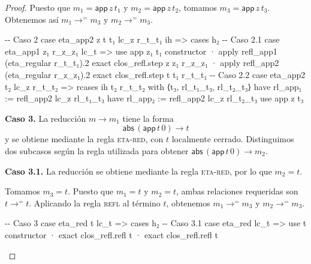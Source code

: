 \documentclass[
  spanish,
  letterpaper,
  DIV=11,
  numbers=noendperiod]{scrreprt}
\newenvironment{Shaded}{\begin{snugshade}}{\end{snugshade}}
\newcommand{\CommentTok}[1]{\textcolor[rgb]{0.37,0.37,0.37}{#1}}
\newcommand{\KeywordTok}[1]{\textcolor[rgb]{0.00,0.23,0.31}{\textbf{#1}}}
\newcommand{\NormalTok}[1]{\textcolor[rgb]{0.00,0.23,0.31}{#1}}
\renewcommand{\NormalTok}[1]{\textcolor[HTML]{000000}{#1}}
\renewcommand{\KeywordTok}[1]{\textcolor[HTML]{0000FF}{#1}}
\renewcommand{\CommentTok}[1]{\textcolor[HTML]{008000}{#1}}
\let\oldgreater\textgreater
\renewcommand{\textgreater}{\null\oldgreater}%
\theoremstyle{remark}
\begin{document}
\begin{proof}
Puesto que \(m_1=\mathsf{app}\,z\,t_1\) y \(m_2=\mathsf{app}\,z\,t_2\),
tomamos \(m_3=\mathsf{app}\,z\,t_3\). Obtenemos así
\(m_1\longrightarrow^{=}m_3\) y \(m_2\longrightarrow^{=}m_3\).

\begin{Shaded}
\begin{Highlighting}[]
  \CommentTok{{-}{-} Caso 2}
\NormalTok{  case eta\_app2 z t t₁ lc\_z r\_t\_t₁ ih =\textgreater{}}
\NormalTok{    cases h₂}
    \CommentTok{{-}{-} Caso 2.1}
\NormalTok{    case eta\_app1 z₁ r\_z\_z₁ lc\_t =\textgreater{}}
\NormalTok{      use app z₁ t₁}
\NormalTok{      constructor}
\NormalTok{      · }\KeywordTok{apply}\NormalTok{ refl\_app1 (eta\_regular r\_t\_t₁).2}
        \KeywordTok{exact}\NormalTok{ clos\_refl.step z z₁ r\_z\_z₁}
\NormalTok{      · }\KeywordTok{apply}\NormalTok{ refl\_app2 (eta\_regular r\_z\_z₁).2}
        \KeywordTok{exact}\NormalTok{ clos\_refl.step t t₁ r\_t\_t₁}
    \CommentTok{{-}{-} Caso 2.2}
\NormalTok{    case eta\_app2 t₂ lc\_z r\_t\_t₂ =\textgreater{}}
\NormalTok{      rcases ih t₂ r\_t\_t₂ }\KeywordTok{with}\NormalTok{ ⟨t₃, rl\_t₁\_t₃, rl\_t₂\_t₃⟩}
      \KeywordTok{have}\NormalTok{ rl\_app₁ := refl\_app2 lc\_z rl\_t₁\_t₃}
      \KeywordTok{have}\NormalTok{ rl\_app₂ := refl\_app2 lc\_z rl\_t₂\_t₃}
\NormalTok{      use app z t₃}
\end{Highlighting}
\end{Shaded}

\textbf{Caso 3.} La reducción \(m\longrightarrow m_1\) tiene la forma \[
\mathsf{abs}\,(\mathsf{app}\,t\,0)\longrightarrow t
\] y se obtiene mediante la regla \textsc{eta-red}, con \(t\) localmente
cerrado. Distinguimos dos subcasos según la regla utilizada para obtener
\(\mathsf{abs}\,(\mathsf{app}\,t\,0)\longrightarrow m_2\).

\textbf{Caso 3.1.} La reducción se obtiene mediante la regla
\textsc{eta-red}, por lo que \(m_2=t\).

Tomamos \(m_3=t\). Puesto que \(m_1=t\) y \(m_2=t\), ambas relaciones
requeridas son \(t\longrightarrow^{=}t\). Aplicando la regla
\textsc{refl} al término \(t\), obtenemos \(m_1\longrightarrow^{=}m_3\)
y \(m_2\longrightarrow^{=}m_3\).

\begin{Shaded}
\begin{Highlighting}[]
  \CommentTok{{-}{-} Caso 3}
\NormalTok{  case eta\_red t lc\_t =\textgreater{}}
\NormalTok{    cases h₂}
    \CommentTok{{-}{-} Caso 3.1}
\NormalTok{    case eta\_red lc\_t =\textgreater{}}
\NormalTok{      use t}
\NormalTok{      constructor}
\NormalTok{      · }\KeywordTok{exact}\NormalTok{ clos\_refl.refl t}
\NormalTok{      · }\KeywordTok{exact}\NormalTok{ clos\_refl.refl t}
\end{Highlighting}
\end{Shaded}


\end{proof}
\end{document}
